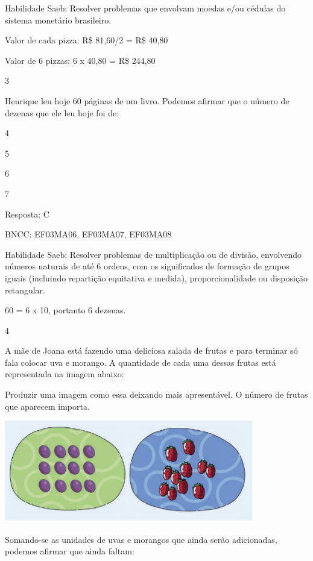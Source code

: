 \begin{escolha}
\begin{escolha}
Habilidade Saeb: Resolver problemas que envolvam moedas e/ou cédulas do
sistema monetário brasileiro.

Valor de cada pizza: R\$ 81,60/2 = R\$ 40,80

Valor de 6 pizzas: 6 x 40,80 = R\$ 244,80

\num{3}

Henrique leu hoje 60 páginas de um livro. Podemos afirmar que o número
de dezenas que ele leu hoje foi de:

\begin{escolha}

\item
  4
\item
  5
\item
  6
\item
  7
\end{escolha}

Resposta: C

BNCC: EF03MA06, EF03MA07, EF03MA08

Habilidade Saeb: Resolver problemas de multiplicação ou de divisão,
envolvendo números naturais de até 6 ordens, com os significados de
formação de grupos iguais (incluindo repartição equitativa e medida),
proporcionalidade ou disposição retangular.

60 = 6 x 10, portanto 6 dezenas.

\num{4}

A mãe de Joana está fazendo uma deliciosa salada de frutas e para
terminar só fala colocar uva e morango. A quantidade de cada uma dessas
frutas está representada na imagem abaixo:

Produzir uma imagem como essa deixando mais apresentável. O número de
frutas que aparecem importa.

\includegraphics[width=4.26704in,height=1.75849in]{media/image132.png}

Somando-se as unidades de uvas e morangos que ainda serão adicionadas,
podemos afirmar que ainda faltam:

\begin{escolha}


\end{escolha}
\end{escolha}
\end{escolha}
